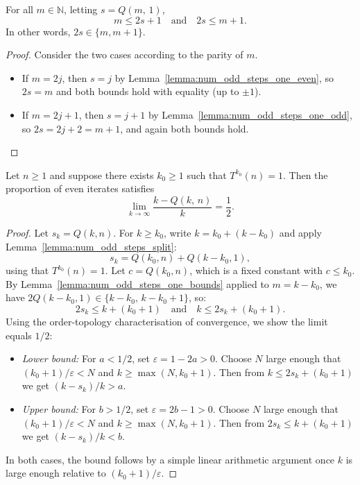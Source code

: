 \begin{lemma}\label{lemma:num_odd_steps_one_bounds}\leanok
For all $m \in \mathbb{N}$, letting $s = Q(m,\, 1)$,
\[
  m \le 2s + 1 \quad \text{and} \quad 2s \le m + 1.
\]
In other words, $2s \in \{m, m+1\}$.
\end{lemma}
\begin{proof}\leanok
Consider the two cases according to the parity of $m$.
\begin{itemize}
\item If $m = 2j$, then $s = j$ by Lemma~\ref{lemma:num_odd_steps_one_even}, so $2s = m$ and both bounds hold with equality (up to $\pm 1$).
\item If $m = 2j + 1$, then $s = j + 1$ by Lemma~\ref{lemma:num_odd_steps_one_odd}, so $2s = 2j + 2 = m + 1$, and again both bounds hold.
\end{itemize}
\end{proof}

\begin{lemma}\label{lemma:forward}\leanok
Let $n \ge 1$ and suppose there exists $k_0 \ge 1$ such that $T^{k_0}(n) = 1$.
Then the proportion of even iterates satisfies
\[
  \lim_{k \to \infty} \frac{k - Q(k,\, n)}{k} = \frac{1}{2}.
\]
\end{lemma}
\begin{proof}\leanok
Let $s_k = Q(k, n)$.
For $k \ge k_0$, write $k = k_0 + (k - k_0)$ and apply Lemma~\ref{lemma:num_odd_steps_split}:
\[
  s_k = Q(k_0, n) + Q(k - k_0, 1),
\]
using that $T^{k_0}(n) = 1$.
Let $c = Q(k_0, n)$, which is a fixed constant with $c \le k_0$.
By Lemma~\ref{lemma:num_odd_steps_one_bounds} applied to $m = k - k_0$, we have $2Q(k-k_0, 1) \in \{k-k_0,\, k-k_0+1\}$, so:
\[
  2s_k \le k + (k_0 + 1) \quad \text{and} \quad k \le 2s_k + (k_0 + 1).
\]
Using the order-topology characterisation of convergence, we show the limit equals $1/2$:
\begin{itemize}
\item \emph{Lower bound:} For $a < 1/2$, set $\varepsilon = 1 - 2a > 0$.
  Choose $N$ large enough that $(k_0 + 1)/\varepsilon < N$ and $k \ge \max(N, k_0+1)$.
  Then from $k \le 2s_k + (k_0 + 1)$ we get $(k - s_k)/k > a$.
\item \emph{Upper bound:} For $b > 1/2$, set $\varepsilon = 2b - 1 > 0$.
  Choose $N$ large enough that $(k_0 + 1)/\varepsilon < N$ and $k \ge \max(N, k_0+1)$.
  Then from $2s_k \le k + (k_0 + 1)$ we get $(k - s_k)/k < b$.
\end{itemize}
In both cases, the bound follows by a simple linear arithmetic argument once $k$ is large enough relative to $(k_0 + 1)/\varepsilon$.
\end{proof}

